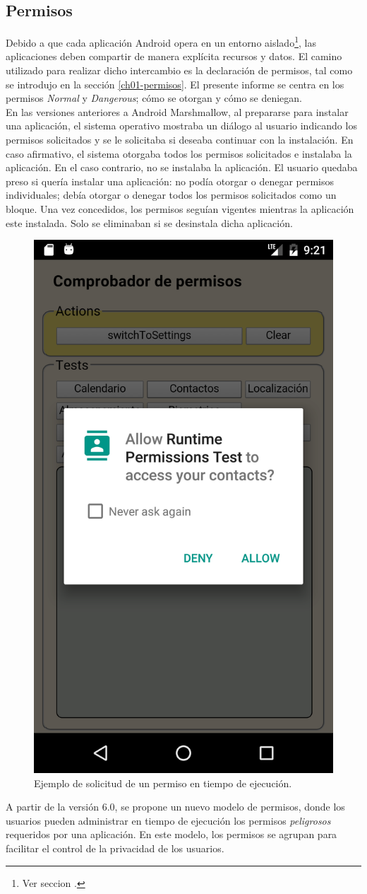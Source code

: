 \subsection{Permisos}
Debido a que cada aplicación Android opera en un entorno aislado\footnote{Ver seccion .}, las aplicaciones deben compartir de manera explícita recursos y datos. El camino utilizado para realizar dicho intercambio es la declaración de permisos, tal como se introdujo en la sección \ref{ch01-permisos}. El presente informe se centra en los permisos \emph{Normal} y \emph{Dangerous}; cómo se otorgan y cómo se deniegan.\\
En las versiones anteriores a Android Marshmallow, al prepararse para instalar una aplicación, el sistema operativo mostraba un diálogo al usuario indicando los permisos solicitados y se le solicitaba si deseaba continuar con la instalación. En caso afirmativo, el sistema otorgaba todos los permisos solicitados e instalaba la aplicación. En el caso contrario, no se instalaba la aplicación. El usuario quedaba preso si quería instalar una aplicación: no podía otorgar o denegar permisos individuales; debía otorgar o denegar todos los permisos solicitados como un bloque. Una vez concedidos, los permisos seguían vigentes mientras la aplicación este instalada. Solo se eliminaban si se desinstala dicha aplicación.\\
\begin{figure}[htbp]
    \centering
    \includegraphics[width=0.35\linewidth]{imgs/chapter5/allow_contact}
    \caption{Ejemplo de solicitud de un permiso en tiempo de ejecución.}
    \label{fig:ch01:permission-request}
\end{figure}
A partir de la versión 6.0, se propone un nuevo modelo de permisos, donde los usuarios pueden administrar en tiempo de ejecución los permisos \textit{peligrosos} requeridos por una aplicación. En este modelo, los permisos se agrupan para facilitar el control de la privacidad de los usuarios.\\
